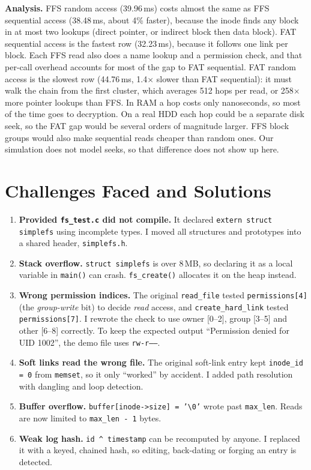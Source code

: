 \documentclass[11pt]{article}
\begin{document}
\textbf{Analysis.} FFS random access (39.96\,ms) costs almost the same as
FFS sequential access (38.48\,ms, about 4\% faster), because the inode finds
any block in at most two lookups (direct pointer, or indirect block then
data block). FAT sequential access is the fastest row (32.23\,ms), because
it follows one link per block. Each FFS read also does a name lookup and a
permission check, and that per-call overhead accounts for most of the gap
to FAT sequential. FAT random access is the slowest row (44.76\,ms,
1.4$\times$ slower than FAT sequential): it must walk the chain from the
first cluster, which averages 512 hops per read, or 258$\times$ more
pointer lookups than FFS. In RAM a hop costs only nanoseconds, so most of
the time goes to decryption. On a real HDD each hop could be a separate
disk seek, so the FAT gap would be several orders of magnitude larger. FFS
block groups would also make sequential reads cheaper than random ones. Our
simulation does not model seeks, so that difference does not show up
here.

\section{Challenges Faced and Solutions}
\begin{enumerate}
  \item \textbf{Provided \texttt{fs\_test.c} did not compile.} It declared
        \texttt{extern struct simplefs} using incomplete types. I moved
        all structures and prototypes into a shared header,
        \texttt{simplefs.h}.
  \item \textbf{Stack overflow.} \texttt{struct simplefs} is over 8\,MB,
        so declaring it as a local variable in \texttt{main()} can crash.
        \texttt{fs\_create()} allocates it on the heap instead.
  \item \textbf{Wrong permission indices.} The original \texttt{read\_file}
        tested \texttt{permissions[4]} (the \emph{group-write} bit) to
        decide \emph{read} access, and \texttt{create\_hard\_link} tested
        \texttt{permissions[7]}. I rewrote the check to use owner [0--2],
        group [3--5] and other [6--8] correctly. To keep the expected
        output ``Permission denied for UID 1002'', the demo file uses
        \texttt{rw-r-----}.
  \item \textbf{Soft links read the wrong file.} The original soft-link
        entry kept \texttt{inode\_id = 0} from \texttt{memset}, so it only
        ``worked'' by accident. I added path resolution with dangling and
        loop detection.
  \item \textbf{Buffer overflow.} \texttt{buffer[inode->size] = '\textbackslash0'}
        wrote past \texttt{max\_len}. Reads are now limited to
        \texttt{max\_len - 1} bytes.
  \item \textbf{Weak log hash.} \texttt{id \^{} timestamp} can be
        recomputed by anyone. I replaced it with a keyed, chained hash, so
        editing, back-dating or forging an entry is detected.
\end{enumerate}
\end{document}

